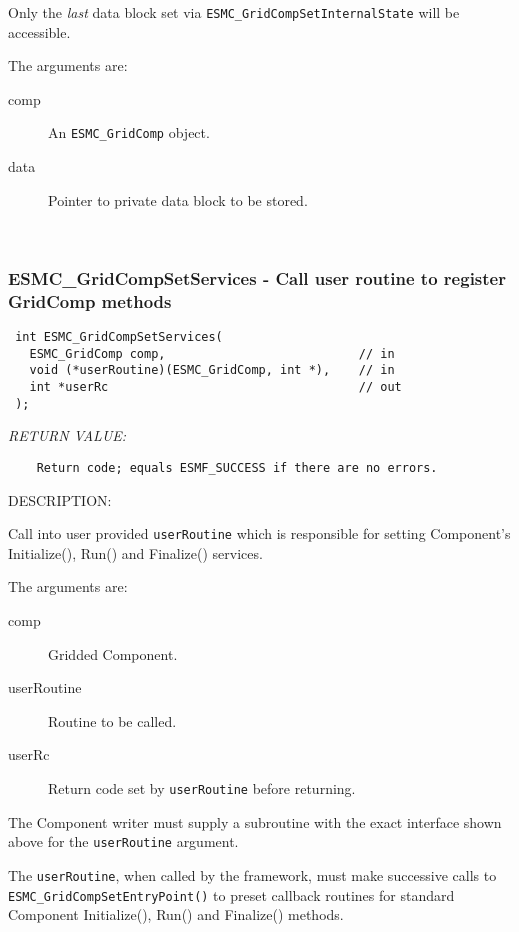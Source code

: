     Only the {\em last} data block set via
    {\tt ESMC\_GridCompSetInternalState} will be accessible.
  
    The arguments are:
    \begin{description}
    \item[comp]
      An {\tt ESMC\_GridComp} object.
    \item[data]
      Pointer to private data block to be stored.
   \end{description}
   
 
\mbox{}\hrulefill\ 
 
\subsubsection [ESMC\_GridCompSetServices] {ESMC\_GridCompSetServices - Call user routine to register GridComp methods}


  
\begin{verbatim} int ESMC_GridCompSetServices(
   ESMC_GridComp comp,                           // in
   void (*userRoutine)(ESMC_GridComp, int *),    // in
   int *userRc                                   // out
 );\end{verbatim}{\em RETURN VALUE:}
\begin{verbatim}    Return code; equals ESMF_SUCCESS if there are no errors.\end{verbatim}
{\sf DESCRIPTION:\\ }


  
    Call into user provided {\tt userRoutine} which is responsible for setting
    Component's Initialize(), Run() and Finalize() services.
  
    The arguments are:
    \begin{description}
    \item[comp]
      Gridded Component. 
    \item[userRoutine]
      Routine to be called.
    \item[userRc]
      Return code set by {\tt userRoutine} before returning.
    \end{description}
    
    The Component writer must supply a subroutine with the exact interface shown
    above for the {\tt userRoutine} argument.
  
    The {\tt userRoutine}, when called by the framework, must make successive
    calls to {\tt ESMC\_GridCompSetEntryPoint()} to preset callback routines for
    standard Component Initialize(), Run() and Finalize() methods. 
  
\setlength{\parskip}{\oldparskip}
\setlength{\parindent}{\oldparindent}
\setlength{\baselineskip}{\oldbaselineskip}
